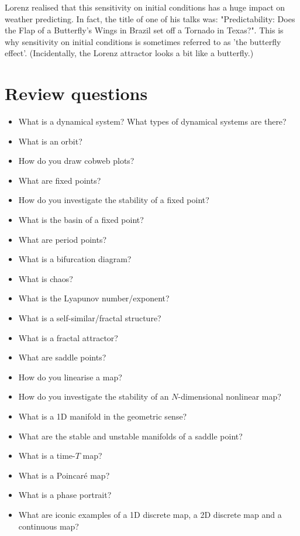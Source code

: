 Lorenz realised that this sensitivity on initial conditions has a huge impact on weather predicting. In fact, the title of one of his talks was: "Predictability: Does the Flap of a Butterfly's Wings in Brazil set off a Tornado in Texas?". This is why sensitivity on initial conditions is sometimes referred to as 'the butterfly effect'. (Incidentally, the Lorenz attractor looks a bit like a butterfly.)

\pagebreak

\section*{Review questions}

\begin{itemize}
\item What is a dynamical system? What types of dynamical systems are there?
\item What is an orbit?
\item How do you draw cobweb plots?
\item What are fixed points?
\item How do you investigate the stability of a fixed point?
\item What is the basin of a fixed point?
\item What are period points?
\item What is a bifurcation diagram?
\item What is chaos?
\item What is the Lyapunov number/exponent?
\item What is a self-similar/fractal structure? 
\item What is a fractal attractor?
\item What are saddle points?
\item How do you linearise a map? 
\item How do you investigate the stability of an $N$-dimensional nonlinear map? 
\item What is a 1D manifold in the geometric sense?
\item What are the stable and unstable manifolds of a saddle point?
\item What is a time-$T$ map?
\item What is a Poincar\'{e} map?
\item What is a phase portrait?
\item What are iconic examples of a 1D discrete map, a 2D discrete map and a continuous map?
\end{itemize}



